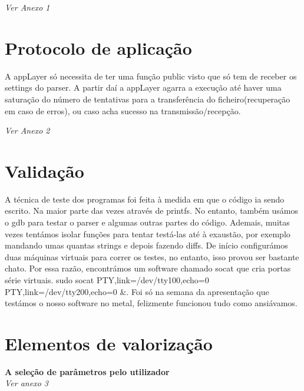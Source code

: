 \documentclass[a4paper]{article}
\begin{document}
\textit{Ver Anexo 1}

\section{Protocolo de aplicação}
A appLayer só necessita de ter uma função public visto que só tem de receber os
settings do parser. A partir daí a appLayer agarra a execução até haver uma
saturação do número de tentativas para a transferência do ficheiro(recuperação
em caso de erros), ou caso acha sucesso na transmissão/recepção.

\textit{Ver Anexo 2}

\section{Validação}
A técnica de teste dos programas foi feita à medida em que o código ia sendo
escrito. Na maior parte das vezes através de printfs. No entanto, também usámos
o gdb para testar o parser e algumas outras partes do código. Ademais, muitas
vezes tentámos isolar funções para tentar testá-las até à exaustão, por exemplo
mandando umas quantas strings e depois fazendo diffs. De início configurámos duas
máquinas virtuais para correr os testes, no entanto, isso provou ser bastante
chato. Por essa razão, encontrámos um software chamado socat que cria portas
série virtuais. sudo socat PTY,link=/dev/tty100,echo=0
PTY,link=/dev/tty200,echo=0 \&. Foi só na semana da apresentação que testámos o
nosso software no metal, felizmente funcionou tudo como ansiávamos.


\section{Elementos de valorização}
\noindent\textbf{A seleção de parâmetros pelo utilizador}\\\textit{Ver anexo
3}\\
\end{document}
